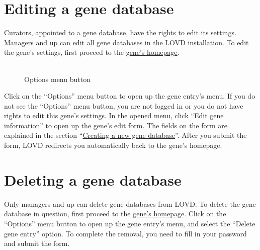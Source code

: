 \documentclass[a4paper,oneside,openany,12pt]{memoir}
\renewenvironment{leftbar}[1][\hsize]
{%
    \def\FrameCommand
    {%
        {\color{LOVDdark}\vrule width 3pt \hspace{5pt}}%
        \colorbox{LOVDlight}%
    }%
    \MakeFramed{\hsize#1\advance\hsize-\width\FrameRestore}%
}
{\endMakeFramed}
\begin{document}
\section{Editing a gene database}
Curators, appointed to a gene database, have the rights to edit its settings.
Managers and up can edit all gene databases in the LOVD installation.
To edit the gene's settings, first proceed to the \hyperlink{s_gene_homepage}{gene's homepage}.
\par
\begin{figure} %
  \vspace{-26pt}
  \begin{framed}
    \\Options menu button
  \end{framed}
\end{figure}
Click on the ``Options'' menu button to open up the gene entry's menu.
If you do not see the ``Options'' menu button, you are not logged in or you do not have rights to edit this gene's settings.
In the opened menu, click ``Edit gene information'' to open up the gene's edit form.
The fields on the form are explained in the section ``\hyperlink{s_gene_create}{Creating a new gene database}''.
After you submit the form, LOVD redirects you automatically back to the gene's homepage.





\section{Deleting a gene database}
Only managers and up can delete gene databases from LOVD.
To delete the gene database in question, first proceed to the \hyperlink{s_gene_homepage}{gene's homepage}.
Click on the ``Options'' menu button to open up the gene entry's menu, and select the ``Delete gene entry'' option.
To complete the removal, you need to fill in your password and submit the form.
\end{document}
